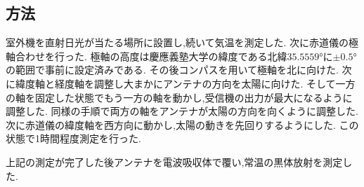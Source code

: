 \subsection{方法}
室外機を直射日光が当たる場所に設置し,続いて気温を測定した.
次に赤道儀の極軸合わせを行った.
極軸の高度は慶應義塾大学の緯度である北緯$35.5559\si{\degree}$に$\pm0.5\si{\degree}$の範囲で事前に設定済みである.
その後コンパスを用いて極軸を北に向けた.
次に緯度軸と経度軸を調整し大まかにアンテナの方向を太陽に向けた.
そして一方の軸を固定した状態でもう一方の軸を動かし,受信機の出力が最大になるように調整した.
同様の手順で両方の軸をアンテナが太陽の方向を向くように調整した.
次に赤道儀の緯度軸を西方向に動かし,太陽の動きを先回りするようにした.
この状態で1時間程度測定を行った.

上記の測定が完了した後アンテナを電波吸収体で覆い,常温の黒体放射を測定した.